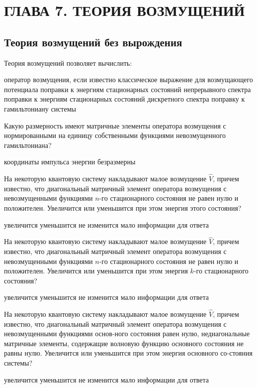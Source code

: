 \documentclass[11pt,a4paper]{exam}
\begin{document}
\section{ ГЛАВА 7. ТЕОРИЯ ВОЗМУЩЕНИЙ }

\subsection{ Теория возмущений без вырождения }

\begin{questions}

\question Теория возмущений позволяет вычислить:
\begin{choices}
\choice оператор возмущения, если известно классическое выражение для возмущающего потенциала
\choice поправки к энергиям стационарных состояний непрерывного спектра
\choice поправки к энергиям стационарных состояний дискретного спектра
\choice поправку к гамильтониану системы
\end{choices}

\question Какую размерность имеют матричные элементы оператора возмущения с нормированными на единицу собственными функциями невозмущенного гамильтониана?
\begin{choices}
\choice координаты  
\choice импульса    
\choice энергии     
\choice безразмерны
\end{choices}

\question На некоторую квантовую систему накладывают малое возмущение $\hat V$, причем известно, что диагональный матричный элемент оператора возмущения с невозмущенными функциями $n$-го стационарного состояния не равен нулю и положителен. Увеличится или уменьшится при этом энергия этого состояния? 
\begin{choices}
\choice увеличится  
\choice уменьшится  
\choice не изменится   
\choice мало информации для ответа
\end{choices}

\question На некоторую квантовую систему накладывают малое возмущение $\hat V$, причем известно, что диагональный матричный элемент оператора возмущения с невозмущенными функциями $n$-го стационарного состояния не равен нулю и положителен. Увеличится или уменьшится при этом энергия $k$-го стационарного состояния? 
\begin{choices}
\choice увеличится  
\choice уменьшится  
\choice не изменится   
\choice мало информации для ответа
\end{choices}

\question На некоторую квантовую систему накладывают малое возмущение $\hat V$, причем известно, что диагональный матричный элемент оператора возмущения с невозмущенными функциями основ-ного состояния равен нулю, недиагональные матричные элементы, содержащие волновую функцию основного состояния не равны нулю. Увеличится или уменьшится при этом энергия основного со-стояния системы? 
\begin{choices}
\choice увеличится  
\choice уменьшится  
\choice не изменится   
\choice мало информации для ответа
\end{choices}


\end{questions}
\end{document}

